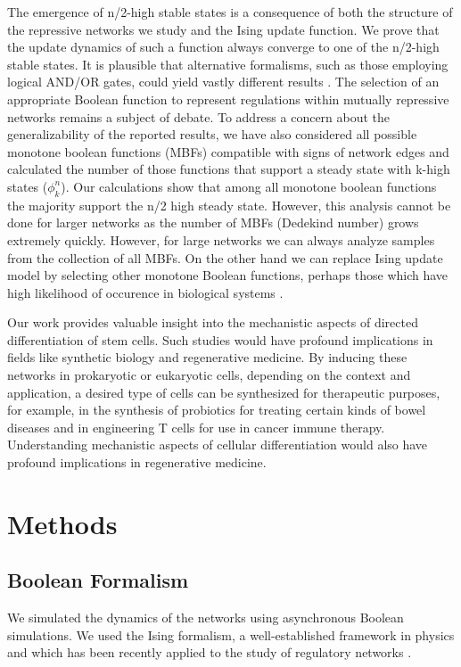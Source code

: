 \documentclass[11pt,a4paper]{article}
\theoremstyle{definition}
\theoremstyle{remark}
\begin{document}
The emergence of n/2-high stable states is a consequence of both the structure of the repressive networks we study and the Ising update function. We prove that the update dynamics of such a function always converge to one of the n/2-high stable states. It is plausible that alternative formalisms, such as those employing logical AND/OR gates, could yield vastly different results \parencite{andrecut_monte-carlo_2011, gedeon_network_2024}. The selection of an appropriate Boolean function to represent regulations within mutually repressive networks remains a subject of debate. To address a concern about the generalizability of the reported results, we have also considered all possible monotone boolean functions (MBFs) compatible with signs of network edges and calculated the number of those functions that support a steady state with k-high states ($\phi_k^n$). Our calculations show that among all monotone boolean functions the majority support the n/2 high steady state. However, this analysis cannot be done for larger networks as the number of MBFs (Dedekind number) grows extremely quickly. However, for large networks we can always analyze samples from the collection of all MBFs. On the other hand we can replace Ising update model by selecting other monotone Boolean functions, perhaps those which have high likelihood of occurence in biological systems \parencite{kadelka_canalization_2024, subbaroyan_minimum_2022}.

Our work provides valuable insight into the mechanistic aspects of directed differentiation of stem cells. Such studies would have profound implications in fields like synthetic biology and regenerative medicine. By inducing these networks in prokaryotic or eukaryotic cells, depending on the context and application, a desired type of cells can be synthesized for therapeutic purposes, for example, in the synthesis of probiotics for treating certain kinds of bowel diseases and in engineering T cells for use in cancer immune therapy. Understanding mechanistic aspects of cellular differentiation would also have profound implications in regenerative medicine.

\section{Methods}
\subsection{Boolean Formalism}
\label{bmodel}
We simulated the dynamics of the networks using asynchronous Boolean simulations. We used the Ising formalism, a well-established framework in physics \parencite{bortz_new_1975} and which has been recently applied to the study of regulatory networks \parencite{hari_emergent_2022, font-clos_topography_2018}. 
\end{document}
